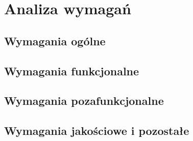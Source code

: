 \chapter{Analiza wymagań}

\section{Wymagania ogólne}
\section{Wymagania funkcjonalne}
\section{Wymagania pozafunkcjonalne}
\section{Wymagania jakościowe i pozostałe}
